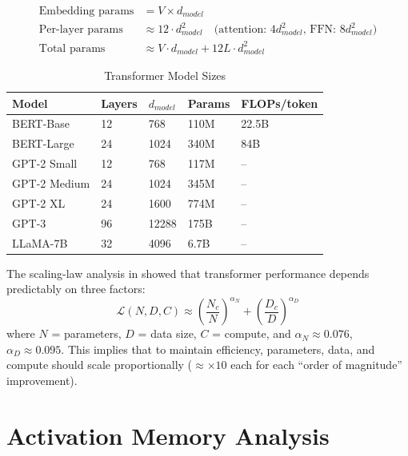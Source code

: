 \begin{align}
\text{Embedding params} &= V \times d_{model} \\
\text{Per-layer params} &\approx 12 \cdot d_{model}^2 \quad \text{(attention: } 4d_{model}^2 \text{, FFN: } 8d_{model}^2) \\
\text{Total params} &\approx V \cdot d_{model} + 12 L \cdot d_{model}^2
\end{align}

\begin{table}[ht]
    \centering
    \caption{Transformer Model Sizes}
    \begin{tabular}{L{2.5cm} L{1.5cm} L{2cm} L{2cm} L{2cm}}
        \toprule
        \textbf{Model} & \textbf{Layers} & $d_{model}$ & \textbf{Params} & \textbf{FLOPs/token} \\
        \midrule
        BERT-Base & 12 & 768 & 110M & 22.5B \\
        BERT-Large & 24 & 1024 & 340M & 84B \\
        GPT-2 Small & 12 & 768 & 117M & -- \\
        GPT-2 Medium & 24 & 1024 & 345M & -- \\
        GPT-2 XL & 24 & 1600 & 774M & -- \\
        GPT-3 & 96 & 12288 & 175B & -- \\
        LLaMA-7B & 32 & 4096 & 6.7B & -- \\
        \bottomrule
    \end{tabular}
\end{table}

\begin{note}
The scaling-law analysis in \cite{kaplan2020scaling} showed that transformer performance depends predictably on three factors:
\begin{equation}
\mathcal{L}(N, D, C) \approx \left(\frac{N_c}{N}\right)^{\alpha_N} + \left(\frac{D_c}{D}\right)^{\alpha_D}
\end{equation}
where $N$ = parameters, $D$ = data size, $C$ = compute, and $\alpha_N \approx 0.076$, $\alpha_D \approx 0.095$. This implies that to maintain efficiency, parameters, data, and compute should scale proportionally ($\approx \times 10$ each for each ``order of magnitude'' improvement).
\end{note}

\section{Activation Memory Analysis}

